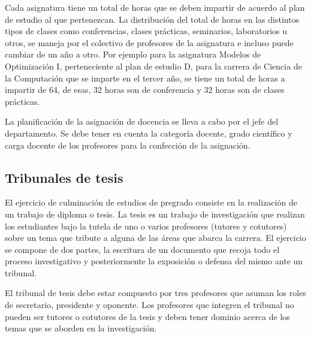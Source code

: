 Cada asignatura tiene un total de horas que se deben impartir de acuerdo 
al plan de estudio al que pertenezcan. La distribución del total de horas 
en las distintos tipos de clases como conferencias, clases prácticas, seminarios, 
laboratorios u otros, se maneja por el colectivo de profesores de la asignatura e incluso
puede cambiar de un año a otro. Por ejemplo para la asignatura Modelos de Optimización I, perteneciente
al plan de estudio D, para la carrera de Ciencia de la Computación que 
se imparte en el tercer año, se tiene un total de horas a impartir de 64,
de esas, 32 horas son de conferencia y 32 horas son de clases prácticas.





La planificación de la asignación de docencia se lleva a cabo por el jefe del 
departamento. Se debe tener en cuenta la categoría docente, grado científico y carga docente 
de los profesores para la confección de la asignación. 







\subsection{Tribunales de tesis}

El ejercicio de culminación de estudios de pregrado consiste en la 
realización de un trabajo de diploma o tesis.
La tesis es un trabajo de investigación que realizan
los estudiantes bajo la tutela de uno o varios profesores (tutores y cotutores)
sobre un tema que tribute a alguna de las áreas que abarca la carrera.
El ejercicio se compone de dos partes, la escritura de un documento que recoja
todo el proceso investigativo y posteriormente la exposición o defensa del mismo ante 
un tribunal.

El tribunal de tesis debe estar compuesto por tres profesores que asuman los roles de 
secretario, presidente y oponente. Los profesores que integren el tribunal no pueden 
ser tutores o cotutores de la tesis y deben tener 
dominio acerca de los temas que se aborden en la investigación.

